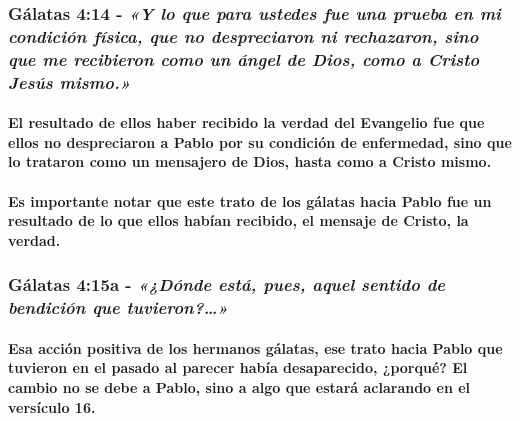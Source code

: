 \documentclass[11a pt,twoside]{article}
\newcommand{\scripture}[1]{%
  {\fontsize{12pt}{16pt}\selectfont\ScriptureFont\itshape #1}%
}
\let\oldsubsubsection\subsubsection
\renewcommand{\subsubsection}{\needspace{4\baselineskip}\oldsubsubsection}
\let\oldparagraph\paragraph
\renewcommand{\paragraph}{\needspace{3\baselineskip}\oldparagraph}
\begin{document}
\subsubsection{\texorpdfstring{Gálatas 4:14 -
\scripture{«Y lo que para ustedes fue una prueba en mi condición física, que no despreciaron ni rechazaron, sino que me recibieron como un ángel de Dios, como a Cristo Jesús mismo.»}}{Gálatas 4:14 - }}\label{guxe1latas-414---y-lo-que-para-ustedes-fue-una-prueba-en-mi-condiciuxf3n-fuxedsica-que-no-despreciaron-ni-rechazaron-sino-que-me-recibieron-como-un-uxe1ngel-de-dios-como-a-cristo-jesuxfas-mismo.}

\paragraph{El resultado de ellos haber recibido la verdad del Evangelio
fue que ellos no despreciaron a Pablo por su condición de enfermedad,
sino que lo trataron como un mensajero de Dios, hasta como a Cristo
mismo.}\label{el-resultado-de-ellos-haber-recibido-la-verdad-del-evangelio-fue-que-ellos-no-despreciaron-a-pablo-por-su-condiciuxf3n-de-enfermedad-sino-que-lo-trataron-como-un-mensajero-de-dios-hasta-como-a-cristo-mismo.}

\paragraph{Es importante notar que este trato de los gálatas hacia Pablo
fue un resultado de lo que ellos habían recibido, el mensaje de Cristo,
la
verdad.}\label{es-importante-notar-que-este-trato-de-los-guxe1latas-hacia-pablo-fue-un-resultado-de-lo-que-ellos-habuxedan-recibido-el-mensaje-de-cristo-la-verdad.}

\subsubsection{\texorpdfstring{Gálatas 4:15a -
\scripture{«¿Dónde está, pues, aquel sentido de bendición que tuvieron?…»}}{Gálatas 4:15a - }}\label{guxe1latas-415a---duxf3nde-estuxe1-pues-aquel-sentido-de-bendiciuxf3n-que-tuvieron}

\paragraph{Esa acción positiva de los hermanos gálatas, ese trato hacia
Pablo que tuvieron en el pasado al parecer había desaparecido, ¿porqué?
El cambio no se debe a Pablo, sino a algo que estará aclarando en el
versículo
16.}\label{esa-acciuxf3n-positiva-de-los-hermanos-guxe1latas-ese-trato-hacia-pablo-que-tuvieron-en-el-pasado-al-parecer-habuxeda-desaparecido-porquuxe9-el-cambio-no-se-debe-a-pablo-sino-a-algo-que-estaruxe1-aclarando-en-el-versuxedculo-16.}
\end{document}
